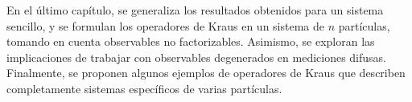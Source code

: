 En el último capítulo, se generaliza los resultados obtenidos para un sistema sencillo, y se formulan los operadores de Kraus en un sistema de $n$ partículas, tomando en cuenta observables no factorizables. Asimismo, se exploran las implicaciones de trabajar con observables degenerados en mediciones difusas. Finalmente, se proponen algunos ejemplos de operadores de Kraus que describen completamente sistemas específicos de varias partículas. 



\begin{comment}


Durante el proyecto de prácticas se trabajó en la descripción completa de las mediciones difusas para el caso en el que el sistema solo cuenta con dos partículas.

La matriz de densidad es una herramienta utilizada para describir al estado de un sistema cuántico que será útil en el desarrollo de todo el trabajo. En el primer capítulo  se presenta la revisión y estudio bibliográfico que se realizó sobre el formalismo de la matriz de densidad en mecánica cuántica. 


 

 En el tercer capítulo se estudia el formalismo de
las operaciones cuánticas y su representación como suma de operadores.

En suma, En especial, la
representación como suma de operadores de las operaciones cuánticas y los operadores POVM serán de utilidad para la descripción de las mediciones difusas. 






\end{comment}